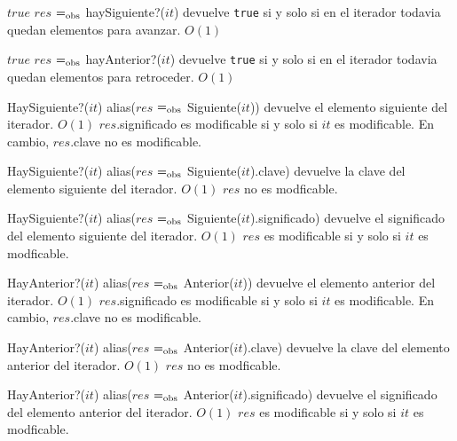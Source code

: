 	{$true$}  
  {$res$ $=_{\mathrm{obs}}$ haySiguiente?($it$)}
  {devuelve \texttt{true} si y solo si en el iterador todavia quedan elementos para avanzar.}
  {$O(1)$}
  {}

	{$true$}    
  {$res$ $=_{\mathrm{obs}}$ hayAnterior?($it$)}
  {devuelve \texttt{true} si y solo si en el iterador todavia quedan elementos para retroceder.}
  {$O(1)$}
  {}

  {HaySiguiente?($it$)}
  {alias($res$ $=_{\mathrm{obs}}$ Siguiente($it$))}
  {devuelve el elemento siguiente del iterador.}
  {$O(1)$}
  {$res$.significado es modificable si y solo si $it$ es modificable.  En cambio, $res$.clave no es modificable.}
  
  {HaySiguiente?($it$)}
  {alias($res$ $=_{\mathrm{obs}}$ Siguiente($it$).clave)}
  {devuelve la clave del elemento siguiente del iterador.}
  {$O(1)$}
  {$res$ no es modficable.}

  {HaySiguiente?($it$)}
  {alias($res$ $=_{\mathrm{obs}}$ Siguiente($it$).significado)}
  {devuelve el significado del elemento siguiente del iterador.}
  {$O(1)$}
  {$res$ es modificable si y solo si $it$ es modficable.}

  {HayAnterior?($it$)}
  {alias($res$ $=_{\mathrm{obs}}$ Anterior($it$))}
  {devuelve el elemento anterior del iterador.}
  {$O(1)$}
  {$res$.significado es modificable si y solo si $it$ es modificable.  En cambio, $res$.clave no es modificable.}

  {HayAnterior?($it$)}
  {alias($res$ $=_{\mathrm{obs}}$ Anterior($it$).clave)}
  {devuelve la clave del elemento anterior del iterador.}
  {$O(1)$}
  {$res$ no es modficable.}

  {HayAnterior?($it$)}
  {alias($res$ $=_{\mathrm{obs}}$ Anterior($it$).significado)}
  {devuelve el significado del elemento anterior del iterador.}
  {$O(1)$}
  {$res$ es modificable si y solo si $it$ es modficable.}


